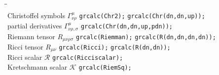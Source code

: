 \documentclass[10pt,twoside,notitlepage,a4paper,fleqn,openbib]{report}
\begin{document}
\begin{tabbing}\hspace*{0.5cm}\=\hspace*{5cm}\=\hspace*{4.5cm}\=\\
 \>Christoffel symbols $\Gamma_{\nu\rho}^{\mu}$ \> \verb+grcalc(Chr2);+ \> \verb+grcalc(Chr(dn,dn,up));+\\
 \>partial derivatives $\Gamma_{\nu\rho,\sigma}^{\mu}$ \> \> \verb+grcalc(Chr(dn,dn,up,pdn));+\\
 \>Riemann tensor $R_{\mu\nu\rho\sigma}$ \> \verb+grcalc(Riemman);+ \> \verb+grcalc(R(dn,dn,dn,dn));+\\
 \>Ricci tensor $R_{\mu\nu}$ \> \verb+grcalc(Ricci);+ \> \verb+grcalc(R(dn,dn));+\\
 \>Ricci scalar $\mathcal{R}$ \> \verb+grcalc(Ricciscalar);+\\
 \>Kretschmann scalar $\mathcal{K}$ \> \verb+grcalc(RiemSq);+\\
\end{tabbing}
 


\end{document}
